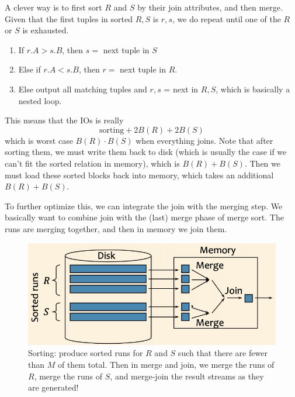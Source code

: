 \documentclass{article}
\begin{document}
    \begin{definition} 
      A clever way is to first sort $R$ and $S$ by their join attributes, and then merge. Given that the first tuples in sorted $R, S$ is $r, s$, we do repeat until one of the $R$ or $S$ is exhausted. 
      \begin{enumerate}
        \item If $r.A > s.B$, then $s =$ next tuple in $S$ 
        \item Else if $r.A < s.B$, then $r =$ next tuple in $R$. 
        \item Else output all matching tuples and $r, s$ = next in $R, S$, which is basically a nested loop. 
      \end{enumerate}
      This means that the IOs is really 
      \begin{equation}
        \text{sorting} + 2 B(R) + 2 B(S)
      \end{equation}
      which is worst case $B(R) \cdot B(S)$ when everything joins. Note that after sorting them, we must write them back to disk (which is usually the case if we can't fit the sorted relation in memory), which is $B(R) + B(S)$. Then we must load these sorted blocks back into memory, which takes an additional $B(R) + B(S)$. 

      To further optimize this, we can integrate the join with the merging step. We basically want to combine join with the (last) merge phase of merge sort. The runs are merging together, and then in memory we join them. 

      \begin{figure}[H]
        \centering 
        \includegraphics[scale=0.4]{img/smj_optim.png}
        \caption{Sorting: produce sorted runs for $R$ and $S$ such that there are fewer than $M$ of them total. Then in merge and join, we merge the runs of $R$, merge the runs of $S$, and merge-join the result streams as they are generated!} 
        \label{fig:smj_optim}
      \end{figure}


\end{definition}
\end{document}

